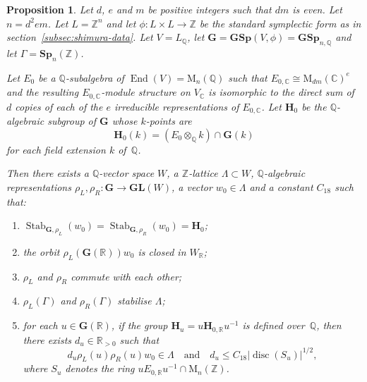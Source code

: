 \documentclass[11pt]{article}
\numberwithin{equation}{section}
\newenvironment{enumeratei}
{\bgroup\def\theenumi{\roman{enumi}}\def\theenumii{\alph{enumii}}\begin{enumerate}}
{\end{enumerate}\egroup}
\newcommand{\bC}{\mathbb{C}}
\newcommand{\bQ}{\mathbb{Q}}
\newcommand{\bR}{\mathbb{R}}
\newcommand{\bZ}{\mathbb{Z}}
\newcommand{\gG}{\mathbf{G}}
\newcommand{\gGL}{\mathbf{GL}}
\newcommand{\gGSp}{\mathbf{GSp}}
\newcommand{\gH}{\mathbf{H}}
\newcommand{\gSp}{\mathbf{Sp}}
\newcommand{\rM}{\mathrm{M}}
\DeclareMathOperator{\disc}{disc}
\DeclareMathOperator{\End}{End}
\DeclareMathOperator{\Stab}{Stab}
\newcommand{\abs}[1]{\lvert #1 \rvert}
\newtheorem{proposition}[lemma]{Proposition}
\begin{document}
\begin{proposition} \label{reps-closed-orbits}
Let $d$, $e$ and $m$ be positive integers such that $dm$ is even.
Let $n = d^2em$.
Let $L = \bZ^n$ and let $\phi \colon L \times L \to \bZ$ be the standard symplectic form as in section~\ref{subsec:shimura-data}.
Let $V = L_\bQ$, let $\gG = \gGSp(V, \phi) = \gGSp_{n,\bQ}$ and let $\Gamma = \gSp_n(\bZ)$.

Let $E_0$ be a $\bQ$-subalgebra of $\End(V) = \rM_n(\bQ)$ such that $E_{0,\bC} \cong \rM_{dm}(\bC)^e$ and the resulting $E_{0,\bC}$-module structure on $V_\bC$ is isomorphic to the direct sum of $d$ copies of each of the $e$ irreducible representations of $E_{0,\bC}$.
Let $\gH_0$ be the $\bQ$-algebraic subgroup of $\gG$ whose $k$-points are
\[
\gH_0(k) = (E_0 \otimes_\bQ k) \cap \gG(k)
\]
for each field extension $k$ of~$\bQ$.

Then there exists a $\bQ$-vector space $W$, a $\bZ$-lattice $\Lambda \subset W$, $\bQ$-algebraic representations $\rho_L, \rho_R \colon \gG \to \gGL(W)$, a vector $w_0 \in \Lambda$ and a constant $C_{18}$ such that:
\begin{enumeratei}
\item \label{reps-closed-orbitsi} $\Stab_{\gG,\rho_L}(w_0) = \Stab_{\gG,\rho_R}(w_0) = \gH_0$;

\item \label{reps-closed-orbitsii} the orbit $\rho_L(\gG(\bR))w_0$ is closed in $W_\bR$;

\item \label{reps-closed-orbitsiii} $\rho_L$ and $\rho_R$ commute with each other;

\item \label{reps-closed-orbitsiv} $\rho_L(\Gamma)$ and $\rho_R(\Gamma)$ stabilise $\Lambda$;

\item \label{reps-closed-orbitsv} for each $u \in \gG(\bR)$, if the group $\gH_u = u \gH_{0,\bR} u^{-1}$ is defined over~$\bQ$, then there exists $d_u \in \bR_{>0}$ such that
\[
d_u \rho_L(u) \rho_R(u) w_0 \in \Lambda \quad \text{and} \quad d_u \leq C_{18} \abs{\disc(S_u)}^{1/2},
\]
where $S_u$ denotes the ring $u E_{0,\bR} u^{-1} \cap \rM_n(\bZ)$.
\end{enumeratei}
\end{proposition}
\end{document}
